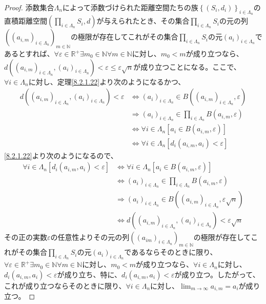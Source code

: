 \documentclass[dvipdfmx]{jsarticle}
\begin{document}
\begin{proof}
添数集合$\varLambda_{n}$によって添数づけられた距離空間たちの族$\left\{ \left( S_{i},d_{i} \right) \right\}_{i \in \varLambda_{n}}$の直積距離空間$\left( \prod_{i \in \varLambda_{n}} S_{i},d \right)$が与えられたとき、その集合$\prod_{i \in \varLambda_{n}} S_{i}$の元の列$\left( \left( a_{i,m} \right)_{i \in \varLambda_{n}} \right)_{m \in \mathbb{N}}$の極限が存在してこれがその集合$\prod_{i \in \varLambda_{n}} S_{i}$の元$\left( a_{i} \right)_{i \in \varLambda_{n}}$であるとすれば、$\forall\varepsilon \in \mathbb{R}^{+}\exists m_{0} \in \mathbb{N}\forall m \in \mathbb{N}$に対し、$m_{0} < m$が成り立つなら、$d\left( \left( a_{i,m} \right)_{i \in \varLambda_{n}},\left( a_{i} \right)_{i \in \varLambda_{n}} \right) < \varepsilon \leq \varepsilon\sqrt{n}$が成り立つことになる。ここで、$\forall i \in \varLambda_{n}$に対し、定理\ref{8.2.1.22}より次のようになるかつ、
\begin{align*}
d\left( \left( a_{i,m} \right)_{i \in \varLambda_{n}},\left( a_{i} \right)_{i \in \varLambda_{n}} \right) < \varepsilon &\Leftrightarrow \left( a_{i} \right)_{i \in \varLambda_{n}} \in B\left( \left( a_{i,m} \right)_{i \in \varLambda_{n}},\varepsilon \right)\\
&\Rightarrow \left( a_{i} \right)_{i \in \varLambda_{n}} \in \prod_{i \in \varLambda_{n}} {B\left( a_{i,m},\varepsilon \right)}\\
&\Leftrightarrow \forall i \in \varLambda_{n}\left[ a_{i} \in B\left( a_{i,m},\varepsilon \right) \right]\\
&\Leftrightarrow \forall i \in \varLambda_{n}\left[ d_{i}\left( a_{i,m},a_{i} \right) < \varepsilon \right]
\end{align*}
\ref{8.2.1.22}より次のようになるので、
\begin{align*}
\forall i \in \varLambda_{n}\left[ d_{i}\left( a_{i,m},a_{i} \right) < \varepsilon \right] &\Leftrightarrow \forall i \in \varLambda_{n}\left[ a_{i} \in B\left( a_{i,m},\varepsilon \right) \right]\\
&\Leftrightarrow \left( a_{i} \right)_{i \in \varLambda_{n}} \in \prod_{i \in \varLambda_{n}} {B\left( a_{i,m},\varepsilon \right)}\\
&\Rightarrow \left( a_{i} \right)_{i \in \varLambda_{n}} \in B\left( \left( a_{i,m} \right)_{i \in \varLambda_{n}},\varepsilon\sqrt{n} \right)\\
&\Leftrightarrow d\left( \left( a_{i,m} \right)_{i \in \varLambda_{n}},\left( a_{i} \right)_{i \in \varLambda_{n}} \right) < \varepsilon\sqrt{n}
\end{align*}
その正の実数$\varepsilon$の任意性よりその元の列$\left( \left( a_{im} \right)_{i \in \varLambda_{n}} \right)_{m \in \mathbb{N}}$の極限が存在してこれがその集合$\prod_{i \in \varLambda_{n}} S_{i}$の元$\left( a_{i} \right)_{i \in \varLambda_{n}}$であるならそのときに限り、$\forall\varepsilon \in \mathbb{R}^{+}\exists m_{0} \in \mathbb{N}\forall m \in \mathbb{N}$に対し、$m_{0} < m$が成り立つなら、$\forall i \in \varLambda_{n}$に対し、$d_{i}\left( a_{i,m},a_{i} \right) < \varepsilon$が成り立ち、特に、$d_{i}\left( a_{i,m},a_{i} \right) < \varepsilon$が成り立つ。したがって、これが成り立つならそのときに限り、$\forall i \in \varLambda_{n}$に対し、$\lim_{m \rightarrow \infty}a_{i,m} = a_{i}$が成り立つ。
\end{proof}
\end{document}
